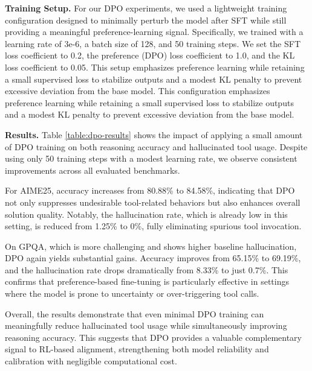 \noindent\textbf{Training Setup.}  
For our DPO experiments, we used a lightweight training configuration designed to minimally perturb the model after SFT while still providing a meaningful preference-learning signal. Specifically, we trained with a learning rate of 3e-6, a batch size of 128, and 50 training steps. We set the SFT loss coefficient to 0.2, the preference (DPO) loss coefficient to 1.0, and the KL loss coefficient to 0.05. This setup emphasizes preference learning while retaining a small supervised loss to stabilize outputs and a modest KL penalty to prevent excessive deviation from the base model.
This configuration emphasizes preference learning while retaining a small supervised loss to stabilize outputs and a modest KL penalty to prevent excessive deviation from the base model.

\noindent\textbf{Results.}  
Table \ref{table:dpo-results} shows the impact of applying a small amount of DPO training on both reasoning accuracy and hallucinated tool usage. Despite using only 50 training steps with a modest learning rate, we observe consistent improvements across all evaluated benchmarks.

For AIME25, accuracy increases from 80.88\% to 84.58\%, indicating that DPO not only suppresses undesirable tool-related behaviors but also enhances overall solution quality. Notably, the hallucination rate, which is already low in this setting, is reduced from 1.25\% to 0\%, fully eliminating spurious tool invocation.

On GPQA, which is more challenging and shows higher baseline hallucination, DPO again yields substantial gains. Accuracy improves from 65.15\% to 69.19\%, and the hallucination rate drops dramatically from 8.33\% to just 0.7\%. This confirms that preference-based fine-tuning is particularly effective in settings where the model is prone to uncertainty or over-triggering tool calls.

Overall, the results demonstrate that even minimal DPO training can meaningfully reduce hallucinated tool usage while simultaneously improving reasoning accuracy. This suggests that DPO provides a valuable complementary signal to RL-based alignment, strengthening both model reliability and calibration with negligible computational cost.

